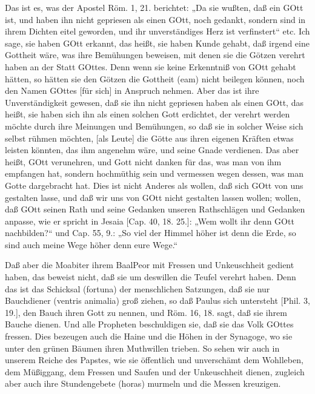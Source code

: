 Das ist es, was der Apostel Röm. 1, 21. berichtet: „Da sie wußten, daß ein GOtt ist, und haben ihn nicht gepriesen als einen GOtt, noch gedankt, sondern sind in ihrem Dichten eitel geworden, und ihr unverständiges Herz ist verfinstert“ etc. Ich sage, sie haben GOtt erkannt, das heißt, sie haben Kunde gehabt, daß irgend eine Gottheit wäre, was ihre Bemühungen beweisen, mit denen sie die Götzen verehrt haben an der Statt GOttes. Denn wenn sie keine Erkenntniß von GOtt gehabt hätten, so hätten sie den Götzen die Gottheit (eam) nicht beilegen können, noch den Namen GOttes [für sich] in Anspruch nehmen. Aber das ist ihre Unverständigkeit gewesen, daß sie ihn nicht gepriesen haben als einen GOtt, das heißt, sie haben sich ihn als einen solchen Gott erdichtet, der verehrt werden möchte durch ihre Meinungen und Bemühungen, so daß sie in solcher Weise sich selbst rühmen möchten, [als Leute] die Götte aus ihren eigenen Kräften etwas leisten könnten, das ihm angenehm wäre, und seine Gnade verdienen. Das aber heißt, GOtt verunehren, und Gott nicht danken für das, was man von ihm empfangen hat, sondern hochmüthig sein und vermessen wegen dessen, was man Gotte dargebracht hat. Dies ist nicht Anderes als wollen, daß sich GOtt von uns gestalten lasse, und daß wir uns von GOtt nicht gestalten lassen wollen; wollen, daß GOtt seinen Rath und seine Gedanken unseren Rathschlägen und Gedanken anpasse, wie er spricht in Jesaia [Cap. 40, 18. 25.]: „Wem wollt ihr denn GOtt nachbilden?“ und Cap. 55, 9.: „So viel der Himmel höher ist denn die Erde, so sind auch meine Wege höher denn eure Wege.“

Daß aber die Moabiter ihrem BaalPeor mit Fressen und Unkeuschheit gedient haben, das beweist nicht, daß sie um deswillen die Teufel verehrt haben. Denn das ist das Schicksal (fortuna) der menschlichen Satzungen, daß sie nur Bauchdiener (ventris animalia) groß ziehen, so daß Paulus sich untersteht [Phil. 3, 19.], den Bauch ihren Gott zu nennen, und Röm. 16, 18. sagt, daß sie ihrem Bauche dienen. Und alle Propheten beschuldigen sie, daß sie das Volk GOttes fressen. Dies bezeugen auch die Haine und die Höhen in der Synagoge, wo sie unter den grünen Bäumen ihren Muthwillen trieben. So sehen wir auch in unserem Reiche des Papstes, wie sie öffentlich und unverschämt dem Wohlleben, dem Müßiggang, dem Fressen und Saufen und der Unkeuschheit dienen, zugleich aber auch ihre Stundengebete (horas) murmeln und die Messen kreuzigen.

